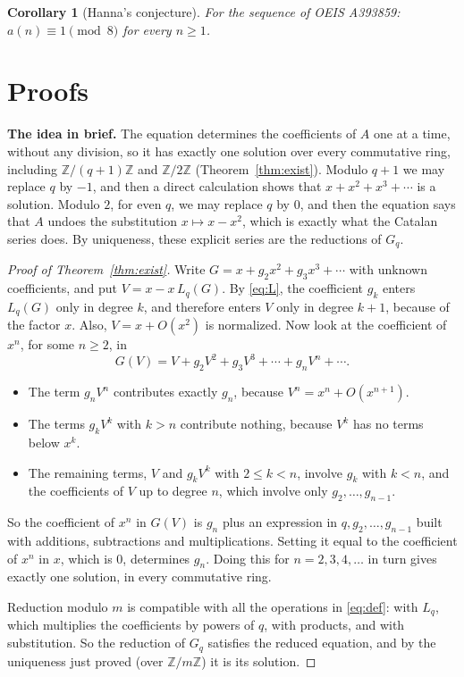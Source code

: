 \documentclass[11pt,a4paper]{article}
\newtheorem{corollary}[theorem]{Corollary}
\theoremstyle{definition}
\theoremstyle{remark}
\newcommand{\Z}{\mathbb{Z}}
\newcommand{\para}[1]{\par\medskip\noindent\textbf{#1}\enspace}
\begin{document}
\begin{corollary}[Hanna's conjecture]\label{cor:oeis}
For the sequence of OEIS A393859: $a(n)\equiv1\pmod{8}$ for every $n\ge1$.
\end{corollary}

\section{Proofs}\label{sec:proofs}

\para{The idea in brief.} The equation determines the coefficients of $A$ one at a time, without any division, so it
has exactly one solution over every commutative ring, including $\Z/(q+1)\Z$ and $\Z/2\Z$
(Theorem~\ref{thm:exist}). Modulo $q+1$ we may replace $q$ by $-1$, and then a direct calculation shows that $x+x^2+x^3+\cdots$ is
a solution. Modulo $2$, for even $q$, we may replace $q$ by $0$, and then the equation says that $A$ undoes the
substitution $x\mapsto x-x^2$, which is exactly what the Catalan series does. By uniqueness, these explicit series
are the reductions of $G_q$.

\begin{proof}[Proof of Theorem~\ref{thm:exist}]
Write $G=x+g_2x^2+g_3x^3+\cdots$ with unknown coefficients, and put $V=x-x\,L_q(G)$. By \eqref{eq:L}, the coefficient
$g_k$ enters $L_q(G)$ only in degree $k$, and therefore enters $V$ only in degree $k+1$, because of the factor $x$. Also,
$V=x+O(x^2)$ is normalized. Now look at the coefficient of $x^n$, for some $n\ge2$, in
\[
G(V)=V+g_2V^2+g_3V^3+\cdots+g_nV^n+\cdots .
\]
\begin{itemize}
\item The term $g_nV^n$ contributes exactly $g_n$, because $V^n=x^n+O(x^{n+1})$.
\item The terms $g_kV^k$ with $k>n$ contribute nothing, because $V^k$ has no terms below $x^k$.
\item The remaining terms, $V$ and $g_kV^k$ with $2\le k<n$, involve $g_k$ with $k<n$, and the coefficients of $V$ up
to degree $n$, which involve only $g_2,\dots,g_{n-1}$.
\end{itemize}
So the coefficient of $x^n$ in $G(V)$ is $g_n$ plus an expression in $q,g_2,\dots,g_{n-1}$ built with additions,
subtractions and multiplications. Setting it equal to the coefficient of $x^n$ in $x$, which is $0$, determines $g_n$.
Doing this for $n=2,3,4,\dots$ in turn gives exactly one solution, in every commutative ring.

Reduction modulo $m$ is compatible with all the operations in \eqref{eq:def}: with $L_q$, which multiplies the
coefficients by powers of $q$, with products, and with substitution. So the reduction of $G_q$ satisfies the reduced
equation, and by the uniqueness just proved (over $\Z/m\Z$) it is its solution.
\end{proof}
\end{document}
